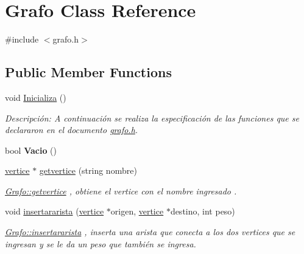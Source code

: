 \hypertarget{class_grafo}{}\section{Grafo Class Reference}
\label{class_grafo}


{\ttfamily \#include $<$grafo.\+h$>$}

\subsection*{Public Member Functions}
\begin{DoxyCompactItemize}
\item 
void \hyperlink{class_grafo_ad0ae89382a426e06cedf7168dc474820}{Inicializa} ()
\begin{DoxyCompactList}\small\item\em Descripción\+: A continuación se realiza la especificación de las funciones que se declararon en el documento \hyperlink{grafo_8h_source}{grafo.\+h}. \end{DoxyCompactList}\item 
\mbox{\label{class_grafo_a58d7b12e5bbcd312f3eff63686153fad}} 
bool {\bfseries Vacio} ()
\item 
\mbox{\label{class_grafo_a97f711c577665d0c574e5acaf19d9175}} 
\hyperlink{classvertice}{vertice} $\ast$ \hyperlink{class_grafo_a97f711c577665d0c574e5acaf19d9175}{getvertice} (string nombre)
\begin{DoxyCompactList}\small\item\em \hyperlink{class_grafo_a97f711c577665d0c574e5acaf19d9175}{Grafo\+::getvertice} , obtiene el vertice con el nombre ingresado . \end{DoxyCompactList}\item 
\mbox{\label{class_grafo_a2590f5ae0405ea80ddc9098d66afe4d0}} 
void \hyperlink{class_grafo_a2590f5ae0405ea80ddc9098d66afe4d0}{insertararista} (\hyperlink{classvertice}{vertice} $\ast$origen, \hyperlink{classvertice}{vertice} $\ast$destino, int peso)
\begin{DoxyCompactList}\small\item\em \hyperlink{class_grafo_a2590f5ae0405ea80ddc9098d66afe4d0}{Grafo\+::insertararista} , inserta una arista que conecta a los dos vertices que se ingresan y se le da un peso que también se ingresa. \end{DoxyCompactList}\item 

\end{DoxyCompactItemize}
